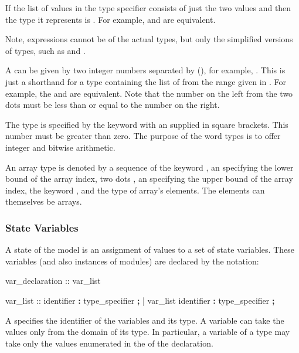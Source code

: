 If the list of values in the \Enum type specifier consists of just the
two values  and  then the type it represents is
\Boolean. 
%
For example,   and
\Boolean are equivalent.

Note, expressions cannot be of the actual \Enum types, but only the
simplified versions of \Enum types, such as \SymbEnum and \IntSymbEnum.

A  can be given by two integer numbers
separated by  (), for example,
. This is just a shorthand for a \Enum type containing the
list of  from the range given in .
%
For example, the   and
 are equivalent. 
%
Note that the number on the left from the two dots must be less than
or equal to the number on the right.

The \Word type is specified by the keyword  with an
 supplied in square brackets. 
This number must be greater than zero.
The purpose of the word types is to offer integer
and bitwise arithmetic.

An array type is denoted by a sequence of the keyword
, an  specifying the lower
bound of the array index, two dots , an
 specifying the upper bound of the array
index, the keyword , and the type of array's elements. The
elements can themselves be arrays.


\subsubsection{State Variables}
\label{State Variables}
%
A state of the model is an assignment of values to a set of state
variables. 
%
These variables (and also instances of modules) are declared by the
notation:
%
\begin{Grammar}
var_declaration ::  var_list

var_list :: identifier \textbf{:} type_specifier \textbf{;}
          | var_list identifier \textbf{:} type_specifier \textbf{;}
\end{Grammar}
%
A  specifies the identifier of the
variables and its type. 
%
A variable can take the values only from the domain of its type. In
particular, a variable of a \Enum type may take only the values
enumerated in the  of the declaration.

